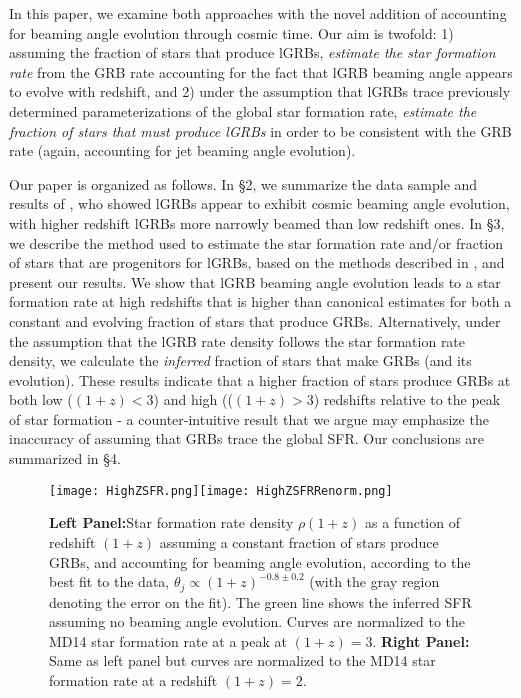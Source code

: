 \documentclass[fleqn,usenatbib,useAMS]{mnras}
\begin{document}
  In this paper, we examine both approaches with the novel addition of accounting for beaming angle evolution through cosmic time.  Our aim is twofold: 1) assuming the fraction of stars that produce lGRBs, {\em estimate the star formation rate} from the GRB rate accounting for the fact that lGRB beaming angle appears to evolve with redshift, and 2) under the assumption that lGRBs trace previously determined parameterizations of the global star formation rate, {\em estimate the fraction of stars that must produce lGRBs} in order to be consistent with the GRB rate (again, accounting for jet beaming angle evolution).   
  
  Our paper is organized as follows.  In \S 2, we summarize the data sample and results of \cite{LR19, LR20}, who showed lGRBs appear to exhibit cosmic beaming angle evolution, with higher redshift lGRBs more narrowly beamed than low redshift ones. In \S 3, we describe the method used to estimate the star formation rate and/or fraction of stars that are progenitors for lGRBs, based on the methods described in \cite{Kist08, Yuk08, Kist09}, and present our results.  We show that lGRB beaming angle evolution leads to a star formation rate at high redshifts that is higher than canonical estimates \citep{MD14} for both a constant and evolving fraction of stars that produce GRBs.   Alternatively, under the assumption that the lGRB rate density follows the \cite{MD14} star formation rate density, we calculate the {\em inferred} fraction of stars that make GRBs (and its evolution). These results indicate that a higher fraction of stars produce GRBs at both low ($(1+z) <3$) and high (($(1+z)>3$) redshifts relative to the peak of star formation - a counter-intuitive result that we argue may emphasize the inaccuracy of assuming that GRBs trace the global SFR.  Our conclusions are summarized in \S  4.
  
  \begin{figure*}
    \centering
    \texttt{[image: HighZSFR.png]}\texttt{[image: HighZSFRRenorm.png]}
    \caption{{\bf Left Panel:}Star formation rate density $\rho(1+z)$ as a function of redshift $(1+z)$ assuming a constant fraction of stars produce GRBs, and accounting for beaming angle evolution, according to the best fit to the data, $\theta_{j} \propto (1+z)^{-0.8 \pm 0.2}$ (with the gray region denoting the error on the fit). The green line shows the inferred SFR assuming no beaming angle evolution.  Curves are normalized to the MD14 star formation rate at a peak at $(1+z) = 3$. {\bf Right Panel:} Same as left panel but curves are normalized to the MD14 star formation rate at a redshift $(1+z) = 2$. }
    \label{fig:SFR}
\end{figure*}
 
\end{document}
